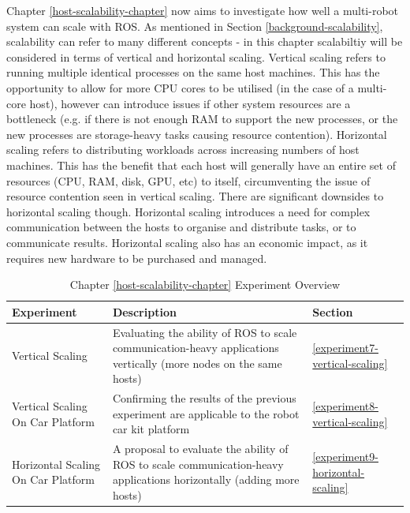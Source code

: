 \documentclass{l4proj}
\begin{document}
Chapter \ref{host-scalability-chapter} now aims to investigate how well a multi-robot system can scale with ROS. As mentioned in Section \ref{background-scalability}, scalability can refer to many different concepts - in this chapter scalabiltiy will be considered in terms of vertical and horizontal scaling. Vertical scaling refers to running multiple identical processes on the same host machines. This has the opportunity to allow for more CPU cores to be utilised (in the case of a multi-core host), however can introduce issues if other system resources are a bottleneck (e.g. if there is not enough RAM to support the new processes, or the new processes are storage-heavy tasks causing resource contention). Horizontal scaling refers to distributing workloads across increasing numbers of host machines. This has the benefit that each host will generally have an entire set of resources (CPU, RAM, disk, GPU, etc) to itself, circumventing the issue of resource contention seen in vertical scaling. There are significant downsides to horizontal scaling though. Horizontal scaling introduces a need for complex communication between the hosts to organise and distribute tasks, or to communicate results. Horizontal scaling also has an economic impact, as it requires new hardware to be purchased and managed.

\begin{table}[H]
    \centering
        \caption{Chapter \ref{host-scalability-chapter} Experiment Overview}
        \label{chapter-4-experiment-overview}
        \begin{tabular}{|p{}|p{}|p{}|}
            \hline
            \textbf{Experiment}                & \textbf{Description}                                                                                                 & \textbf{Section}                       \\ \hline
            Vertical Scaling                   & Evaluating the ability of ROS to scale communication-heavy applications vertically (more nodes on the same hosts)    & \ref{experiment7-vertical-scaling}   \\ \hline
            Vertical Scaling On Car Platform   & Confirming the results of the previous experiment are applicable to the robot car kit platform                       & \ref{experiment8-vertical-scaling}   \\ \hline
            Horizontal Scaling On Car Platform & A proposal to evaluate the ability of ROS to scale communication-heavy applications horizontally (adding more hosts) & \ref{experiment9-horizontal-scaling} \\ \hline
        \end{tabular}
\end{table}
\end{document}
